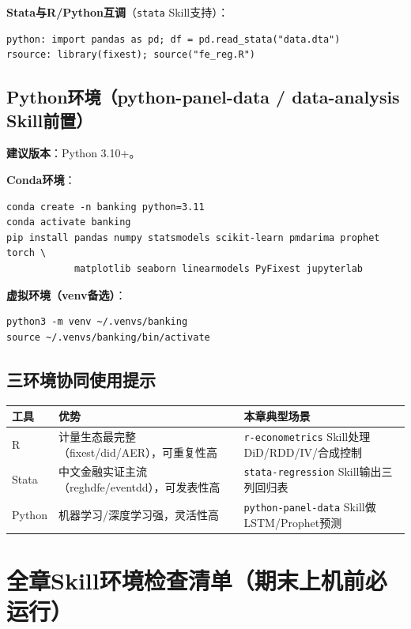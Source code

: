 \textbf{Stata与R/Python互调}（\texttt{stata} Skill支持）：
\begin{lstlisting}[style=stata]
python: import pandas as pd; df = pd.read_stata("data.dta")
rsource: library(fixest); source("fe_reg.R")
\end{lstlisting}

\subsection{Python环境（python-panel-data / data-analysis Skill前置）}

\textbf{建议版本}：Python 3.10+。

\textbf{Conda环境}：
\begin{lstlisting}[style=shell]
conda create -n banking python=3.11
conda activate banking
pip install pandas numpy statsmodels scikit-learn pmdarima prophet torch \
            matplotlib seaborn linearmodels PyFixest jupyterlab
\end{lstlisting}

\textbf{虚拟环境（venv备选）}：
\begin{lstlisting}[style=shell]
python3 -m venv ~/.venvs/banking
source ~/.venvs/banking/bin/activate
\end{lstlisting}

\subsection{三环境协同使用提示}

\begin{table}[H]
\centering
\begin{tabular}{|l|p{4cm}|p{7cm}|}
\hline
\textbf{工具} & \textbf{优势} & \textbf{本章典型场景} \\
\hline
R & 计量生态最完整（fixest/did/AER），可重复性高 & \texttt{r-econometrics} Skill处理DiD/RDD/IV/合成控制 \\
Stata & 中文金融实证主流（reghdfe/eventdd），可发表性高 & \texttt{stata-regression} Skill输出三列回归表 \\
Python & 机器学习/深度学习强，灵活性高 & \texttt{python-panel-data} Skill做LSTM/Prophet预测 \\
\hline
\end{tabular}
\end{table}

\section{全章Skill环境检查清单（期末上机前必运行）}

